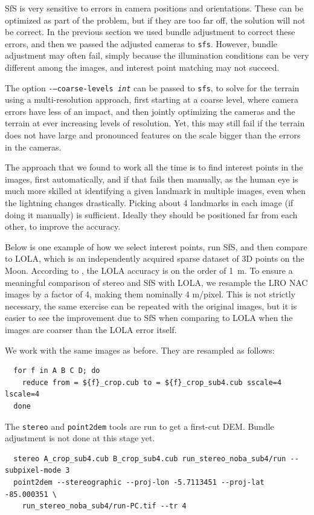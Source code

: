 SfS is very sensitive to errors in camera positions and
orientations. These can be optimized as part of the problem, but if they
are too far off, the solution will not be correct. In the previous
section we used bundle adjustment to correct these errors, and then we
passed the adjusted cameras to \texttt{sfs}. However, bundle adjustment may
often fail, simply because the illumination conditions can be very
different among the images, and interest point matching may not succeed.

The option \texttt{-\/--coarse-levels \it{int}} can be passed to
\texttt{sfs}, to solve for the terrain using a multi-resolution
approach, first starting at a coarse level, where camera errors have
less of an impact, and then jointly optimizing the cameras and
the terrain at ever increasing levels of resolution. Yet, this may still
fail if the terrain does not have large and pronounced features on the
scale bigger than the errors in the cameras.

The approach that we found to work all the time is to find interest points
in the images, first automatically, and if that fails then manually, as
the human eye is much more skilled at identifying a given landmark in
multiple images, even when the lightning changes drastically. Picking
about 4 landmarks in each image (if doing it manually) is
sufficient. Ideally they should be positioned far from each other, to
improve the accuracy.

Below is one example of how we select interest points, run SfS,
and then compare to LOLA, which is an independently acquired
sparse dataset of 3D points on the Moon. According to
\cite{smith2011results}, the LOLA accuracy is on the order of 1~m. To
ensure a meaningful comparison of stereo and SfS with LOLA, we resample
the LRO NAC images by a factor of 4, making them nominally 4
m/pixel. This is not strictly necessary, the same exercise can be
repeated with the original images, but it is easier to see the
improvement due to SfS when comparing to LOLA when the images are
coarser than the LOLA error itself.

We work with the same images as before. They are resampled as follows:
\begin{verbatim}
  for f in A B C D; do 
    reduce from = ${f}_crop.cub to = ${f}_crop_sub4.cub sscale=4 lscale=4
  done
\end{verbatim}

The \texttt{stereo} and \texttt{point2dem} tools are run to get a first-cut DEM. Bundle adjustment is not done at this stage yet. 
\begin{verbatim}
  stereo A_crop_sub4.cub B_crop_sub4.cub run_stereo_noba_sub4/run --subpixel-mode 3
  point2dem --stereographic --proj-lon -5.7113451 --proj-lat -85.000351 \
    run_stereo_noba_sub4/run-PC.tif --tr 4 
\end{verbatim}

